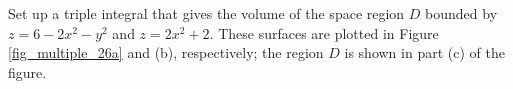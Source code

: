 \begin{example}
\label{ex_trip5}
Set up a triple integral that gives the volume of the space region $D$ bounded by $z=6-2x^2-y^2$ and $z= 2x^2+2$. These surfaces are plotted in Figure \ref{fig_multiple_26a} and (b), respectively; the region $D$ is shown in part (c) of the figure.


\begin{figure}[H]
\centering
\centerline{
\qquad
{}
\qquad
{}}


\end{figure}
\end{example}
